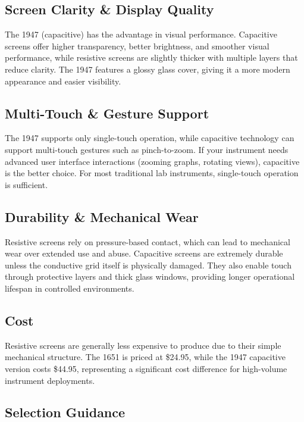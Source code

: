 \subsection{Screen Clarity \& Display Quality}

The 1947 (capacitive) has the advantage in visual performance. Capacitive screens offer higher transparency, better brightness, and smoother visual performance, while resistive screens are slightly thicker with multiple layers that reduce clarity. The 1947 features a glossy glass cover, giving it a more modern appearance and easier visibility.

\subsection{Multi-Touch \& Gesture Support}

The 1947 supports only single-touch operation, while capacitive technology can support multi-touch gestures such as pinch-to-zoom. If your instrument needs advanced user interface interactions (zooming graphs, rotating views), capacitive is the better choice. For most traditional lab instruments, single-touch operation is sufficient.

\subsection{Durability \& Mechanical Wear}

Resistive screens rely on pressure-based contact, which can lead to mechanical wear over extended use and abuse. Capacitive screens are extremely durable unless the conductive grid itself is physically damaged. They also enable touch through protective layers and thick glass windows, providing longer operational lifespan in controlled environments.

\subsection{Cost}

Resistive screens are generally less expensive to produce due to their simple mechanical structure. The 1651 is priced at \$24.95, while the 1947 capacitive version costs \$44.95, representing a significant cost difference for high-volume instrument deployments.

\subsection{Selection Guidance}


